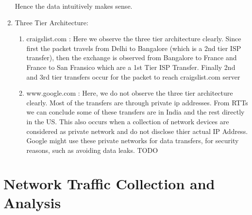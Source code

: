 \documentclass[12pt]{article}
\begin{document}
\begin{enumerate}
    Hence the data intuitively makes sense.
    
    \item Three Tier Architecture:
    \begin{enumerate}
        \item craigslist.com : Here we observe the three tier architecture clearly. Since first the packet travels from Delhi to Bangalore (which is a 2nd tier ISP transfer), then the exchange is observed from Bangalore to France and France to San Fransico which are a 1st Tier ISP Transfer. Finally 2nd and 3rd tier transfers occur for the packet to reach craigslist.com server
        \item www.google.com : Here, we do not observe the three tier architecture clearly. Most of the transfers are through private ip addresses. From RTTs we can conclude some of these transfers are in India and the rest directly in the US. This also occurs when a collection of network devices are considered as private network and do not disclose thier actual IP Address. Google might use these private networks for data transfers, for security reasons, such as avoiding data leaks. TODO
    \end{enumerate}
\end{enumerate}

\section{Network Traffic Collection and Analysis}
\end{document}
